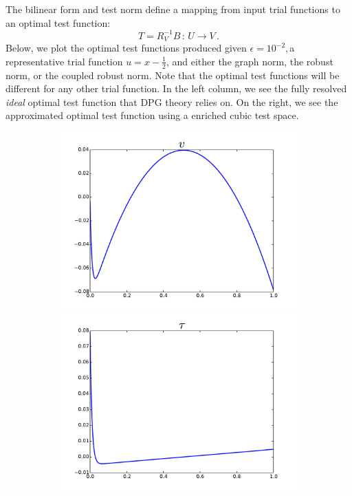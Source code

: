 \documentclass[Dissertation.tex]{subfiles}
\begin{document}
The bilinear form and test norm define a mapping from input trial functions to an optimal test function:
\[
T=R_V^{-1}B\,:\,U\rightarrow V\,.
\]
Below, we plot the optimal test functions produced given $\epsilon=10^{-2}, $a representative trial function $u=x-\frac{1}{2}$,
and either the graph norm, the robust norm, or the coupled robust norm.
Note that the optimal test functions will be different for any other trial function.
In the left column, we see the fully resolved \emph{ideal} optimal test function that DPG theory relies on.
On the right, we see the approximated optimal test function using a enriched cubic test space.
\begin{figure}[ht]
\centering
\begin{subfigure}[t]{0.45\textwidth}
\centering
\includegraphics[width=\textwidth]{OptimalTestFunctions/uLinear_1e-2/steady/graph_steady_v}\\
\includegraphics[width=\textwidth]{OptimalTestFunctions/uLinear_1e-2/steady/graph_steady_tau}\\

\end{subfigure}
\end{figure}
\end{document}
